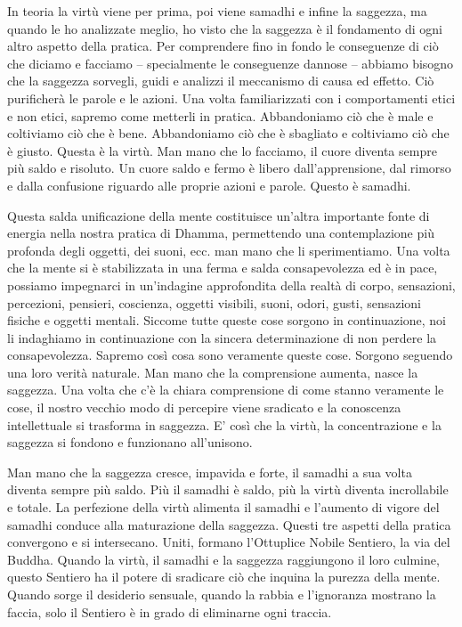 In teoria la virtù viene per prima, poi viene samadhi e infine la
saggezza, ma quando le ho analizzate meglio, ho visto che la saggezza è
il fondamento di ogni altro aspetto della pratica. Per comprendere fino
in fondo le conseguenze di ciò che diciamo e facciamo -- specialmente le
conseguenze dannose -- abbiamo bisogno che la saggezza sorvegli, guidi e
analizzi il meccanismo di causa ed effetto. Ciò purificherà le parole e
le azioni. Una volta familiarizzati con i comportamenti etici e non
etici, sapremo come metterli in pratica. Abbandoniamo ciò che è male e
coltiviamo ciò che è bene. Abbandoniamo ciò che è sbagliato e coltiviamo
ciò che è giusto. Questa è la virtù. Man mano che lo facciamo, il cuore
diventa sempre più saldo e risoluto. Un cuore saldo e fermo è libero
dall'apprensione, dal rimorso e dalla confusione riguardo alle proprie
azioni e parole. Questo è samadhi.

Questa salda unificazione della mente costituisce un'altra importante
fonte di energia nella nostra pratica di Dhamma, permettendo una
contemplazione più profonda degli oggetti, dei suoni, ecc. man mano che
li sperimentiamo. Una volta che la mente si è stabilizzata in una ferma
e salda consapevolezza ed è in pace, possiamo impegnarci in un'indagine
approfondita della realtà di corpo, sensazioni, percezioni, pensieri,
coscienza, oggetti visibili, suoni, odori, gusti, sensazioni fisiche e
oggetti mentali. Siccome tutte queste cose sorgono in continuazione, noi
li indaghiamo in continuazione con la sincera determinazione di non
perdere la consapevolezza. Sapremo così cosa sono veramente queste cose.
Sorgono seguendo una loro verità naturale. Man mano che la comprensione
aumenta, nasce la saggezza. Una volta che c'è la chiara comprensione di
come stanno veramente le cose, il nostro vecchio modo di percepire viene
sradicato e la conoscenza intellettuale si trasforma in saggezza. E'
così che la virtù, la concentrazione e la saggezza si fondono e
funzionano all'unisono.

Man mano che la saggezza cresce, impavida e forte, il samadhi a sua
volta diventa sempre più saldo. Più il samadhi è saldo, più la virtù
diventa incrollabile e totale. La perfezione della virtù alimenta il
samadhi e l'aumento di vigore del samadhi conduce alla maturazione della
saggezza. Questi tre aspetti della pratica convergono e si intersecano.
Uniti, formano l'Ottuplice Nobile Sentiero, la via del Buddha. Quando la
virtù, il samadhi e la saggezza raggiungono il loro culmine, questo
Sentiero ha il potere di sradicare ciò che inquina la purezza della
mente.%
Quando sorge il desiderio sensuale, quando la
rabbia e l'ignoranza mostrano la faccia, solo il Sentiero è in grado di
eliminarne ogni traccia.

